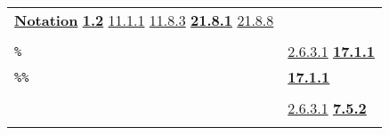 \documentclass[a4paper]{scrbook}
\begin{document}
\begin{longtable}[]{@{}ll@{}}
\begin{minipage}[t]{0.70\columnwidth}
\textbf{\href{00-front-matter.md\#notation}{Notation}} \textbf{\href{01-basic-introduction.md\#12-typing-1}{1.2}}
\href{11-input-output.md\#1111-input}{11.1.1} \href{11-input-output.md\#1183-tyi}{11.8.3}
\textbf{\href{21-interrupts.md\#2181-char-received}{21.8.1}} \href{21-interrupts.md\#2188-unblocked}{21.8.8}\strut
\end{minipage}\tabularnewline
\begin{minipage}[t]{0.24\columnwidth}\raggedright\strut
\strut
\end{minipage} & \begin{minipage}[t]{0.70\columnwidth}\raggedright\strut
\strut
\end{minipage}\tabularnewline
\begin{minipage}[t]{0.24\columnwidth}\raggedright\strut
\texttt{\%}\strut
\end{minipage} & \begin{minipage}[t]{0.70\columnwidth}\raggedright\strut
\href{02-read-evaluate-print.md\#2631-non-pnames}{2.6.3.1} \textbf{\href{17-macro-operations.md\#1711--and-}{17.1.1}}\strut
\end{minipage}\tabularnewline
\begin{minipage}[t]{0.24\columnwidth}\raggedright\strut
\texttt{\%\%}\strut
\end{minipage} & \begin{minipage}[t]{0.70\columnwidth}\raggedright\strut
\textbf{\href{17-macro-operations.md\#1711--and-}{17.1.1}}\strut
\end{minipage}\tabularnewline
\begin{minipage}[t]{0.24\columnwidth}\raggedright\strut
\strut
\end{minipage} & \begin{minipage}[t]{0.70\columnwidth}\raggedright\strut
\strut
\end{minipage}\tabularnewline
\begin{minipage}[t]{0.24\columnwidth}\raggedright\strut
\texttt{\textquotesingle{}}\strut
\end{minipage} & \begin{minipage}[t]{0.70\columnwidth}\raggedright\strut
\href{02-read-evaluate-print.md\#2631-non-pnames}{2.6.3.1}
\textbf{\href{07-structured-objects.md\#752-quote-1}{7.5.2}}\strut
\end{minipage}\tabularnewline
\begin{minipage}[t]{0.24\columnwidth}\raggedright\strut
\strut
\end{minipage} & \begin{minipage}[t]{0.70\columnwidth}\raggedright\strut

\end{minipage}
\end{longtable}
\end{document}
